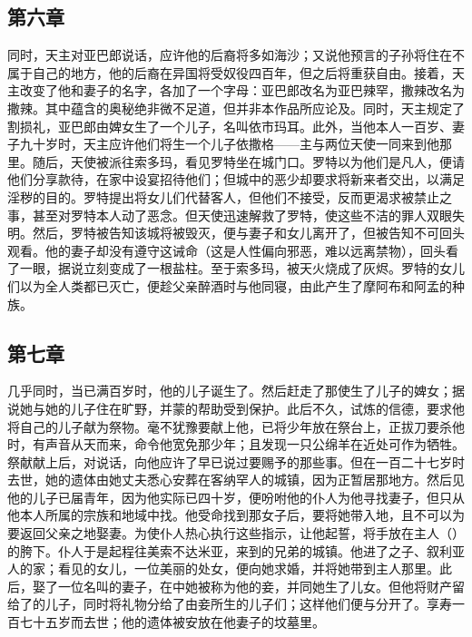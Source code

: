 \subsection{第六章}

同时，天主对亚巴郎说话，应许他的后裔将多如海沙；又说他预言的子孙将住在不属于自己的地方，他的后裔在异国将受奴役四百年，但之后将重获自由。接着，天主改变了他和妻子的名字，各加了一个字母：亚巴郎改名为亚巴辣罕，撒辣改名为撒辣。其中蕴含的奥秘绝非微不足道，但并非本作品所应论及。同时，天主规定了割损礼，亚巴郎由婢女生了一个儿子，名叫依市玛耳。此外，当他本人一百岁、妻子九十岁时，天主应许他们将生一个儿子依撒格——主与两位天使一同来到他那里。随后，天使被派往索多玛，看见罗特坐在城门口。罗特以为他们是凡人，便请他们分享款待，在家中设宴招待他们；但城中的恶少却要求将新来者交出，以满足淫秽的目的。罗特提出将女儿们代替客人，但他们不接受，反而更渴求被禁止之事，甚至对罗特本人动了恶念。但天使迅速解救了罗特，使这些不洁的罪人双眼失明。然后，罗特被告知该城将被毁灭，便与妻子和女儿离开了，但被告知不可回头观看。他的妻子却没有遵守这诫命（这是人性偏向邪恶，难以远离禁物），回头看了一眼，据说立刻变成了一根盐柱。至于索多玛，被天火烧成了灰烬。罗特的女儿们以为全人类都已灭亡，便趁父亲醉酒时与他同寝，由此产生了摩阿布和阿孟的种族。\par


\subsection{第七章}

几乎同时，当已满百岁时，他的儿子诞生了。然后赶走了那使生了儿子的婢女；据说她与她的儿子住在旷野，并蒙的帮助受到保护。此后不久，试炼的信德，要求他将自己的儿子献为祭物。毫不犹豫要献上他，已将少年放在祭台上，正拔刀要杀他时，有声音从天而来，命令他宽免那少年；且发现一只公绵羊在近处可作为牺牲。祭献献上后，对说话，向他应许了早已说过要赐予的那些事。但在一百二十七岁时去世，她的遗体由她丈夫悉心安葬在客纳罕人的城镇，因为正暂居那地方。然后见他的儿子已届青年，因为他实际已四十岁，便吩咐他的仆人为他寻找妻子，但只从他本人所属的宗族和地域中找。他受命找到那女子后，要将她带入地，且不可以为要返回父亲之地娶妻。为使仆人热心执行这些指示，让他起誓，将手放在主人（）的胯下。仆人于是起程往美索不达米亚，来到的兄弟的城镇。他进了之子、叙利亚人的家；看见的女儿，一位美丽的处女，便向她求婚，并将她带到主人那里。此后，娶了一位名叫的妻子，在中她被称为他的妾，并同她生了儿女。但他将财产留给了的儿子，同时将礼物分给了由妾所生的儿子们；这样他们便与分开了。享寿一百七十五岁而去世；他的遗体被安放在他妻子的坟墓里。\par

